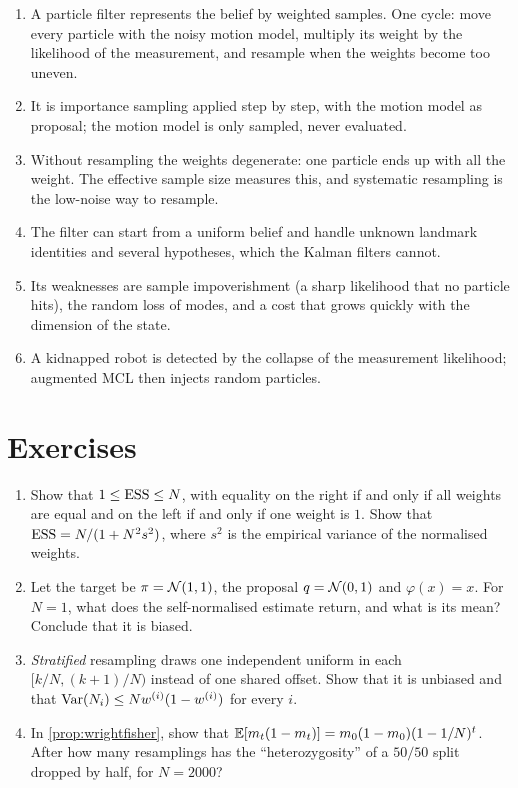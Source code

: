 \begin{enumerate}[nosep]
  \item A particle filter represents the belief by weighted samples. One
    cycle: move every particle with the noisy motion model, multiply its
    weight by the likelihood of the measurement, and resample when the
    weights become too uneven.
  \item It is importance sampling applied step by step, with the motion
    model as proposal; the motion model is only sampled, never evaluated.
  \item Without resampling the weights degenerate: one particle ends up
    with all the weight. The effective sample size measures this, and
    systematic resampling is the low-noise way to resample.
  \item The filter can start from a uniform belief and handle unknown
    landmark identities and several hypotheses, which the Kalman filters
    cannot.
  \item Its weaknesses are sample impoverishment (a sharp likelihood that
    no particle hits), the random loss of modes, and a cost that grows
    quickly with the dimension of the state.
  \item A kidnapped robot is detected by the collapse of the measurement
    likelihood; augmented MCL then injects random particles.
\end{enumerate}

\FloatBarrier
\section*{Exercises}

\begin{enumerate}[label=\textbf{6.\arabic*},ref=6.\arabic*]
\item\label{ex:ess} Show that $1\le\operatorname{ESS}\le N$, with equality on the right
  if and only if all weights are equal and on the left if and only if one
  weight is $1$. Show that $\operatorname{ESS}=N/(1+N^2s^2)$, where $s^2$ is the
  empirical variance of the normalised weights.
\item\label{ex:isbias} Let the target be $\pi=\mathcal{N}(1,1)$, the proposal
  $q=\mathcal{N}(0,1)$ and $\varphi(x)=x$. For $N=1$, what does the
  self-normalised estimate return, and what is its mean? Conclude that it
  is biased.
\item\label{ex:stratified} \emph{Stratified} resampling draws one
  independent uniform in each $[k/N,(k+1)/N)$ instead of one shared
  offset. Show that it is unbiased and that $\operatorname{Var}(N_i)\le Nw^{(i)}
  (1-w^{(i)})$ for every $i$.
\item\label{ex:fixation} In \cref{prop:wrightfisher}, show that
  $\mathbb{E}[m_{t}(1-m_{t})]=m_0(1-m_0)(1-1/N)^t$. After how many resamplings
  has the ``heterozygosity'' of a $50/50$ split dropped by half, for
  $N=2000$?
\end{enumerate}

